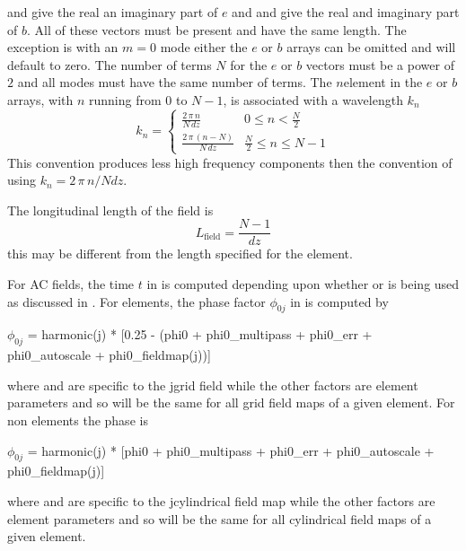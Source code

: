  and  give the real an imaginary part of $e$ and  and  give the
real and imaginary part of $b$. All of these vectors must be present and have the same length. The
exception is with an $m = 0$ mode either the $e$ or $b$ arrays can be omitted and will default to
zero. The number of terms $N$ for the $e$ or $b$ vectors must be a power of $2$ and all modes must
have the same number of terms. The $n$\Th element in the $e$ or $b$ arrays, with $n$ running from 0
to $N-1$, is associated with a wavelength $k_n$
\begin{equation}
  k_n = \begin{cases}
    \frac{2 \, \pi \, n}{N \, dz} & 0 \le n < \frac{N}{2} \\
    \frac{2 \, \pi \, (n-N)}{N \, dz} & \frac{N}{2} \le n \le N - 1
  \end{cases}
\end{equation}
This convention produces less high frequency components then the convention of using $k_n = 2 \, \pi
\, n / N dz$.

The longitudinal length of the field is
\begin{equation}
  L_{\text{field}} = \frac{N - 1}{dz}
\end{equation}
this may be different from the length  specified for the element.

For AC fields, the time $t$ in  is computed depending upon whether  or  is being used as discussed in . For
 elements, the phase factor $\phi_{0j}$ in  is computed by
\begin{example}
  \(\phi_{0j}\) = harmonic(j) * [0.25 - (phi0 + phi0_multipass + phi0_err + 
                                                  phi0_autoscale + phi0_fieldmap(j))] 
\end{example}
where  and  are specific to the j\Th grid field
while the other factors are element parameters and so will be the same for all grid field
maps of a given element. For non  elements the phase is
\begin{example}
  \(\phi_{0j}\) = harmonic(j) * [phi0 + phi0_multipass + phi0_err + 
                                                  phi0_autoscale + phi0_fieldmap(j)]
\end{example}
where  and  are specific to the j\Th cylindrical field map
while the other factors are element parameters and so will be the same for all cylindrical field
maps of a given element.

